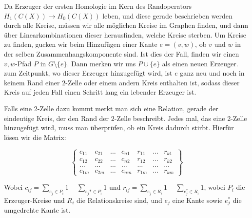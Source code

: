 \documentclass[11pt, a4paper,draft]{report}
\begin{document}
 	Da Erzeuger der ersten Homologie im Kern des Randoperators $H_1(C(X))\rightarrow H_0(C(X))$ leben, und diese gerade beschrieben werden durch alle Kreise, müssen wir alle möglichen Kreise im Graphen finden, und dann über Linearkombinationen dieser herausfinden, welche Kreise sterben.
 	Um Kreise zu finden, gucken wir beim Hinzufügen einer Kante $e=(v,w)$, ob $v$ und $w$ in der selben Zusammenhangskomponente sind. Ist dies der Fall, finden wir einen $v,w$-Pfad $P$ in $G\setminus \{e\}$. Dann merken wir uns $P\cup \{e\}$ als einen neuen Erzeuger. zum Zeitpunkt, wo dieser Erzeuger hinzugefügt wird, ist $e$ ganz neu und noch in keinem Rand einer $2$-Zelle oder einem andern Kreis enthalten ist, sodass dieser Kreis auf jeden Fall einen Schritt lang ein lebender Erzeuger ist. 
 	
 	Falls eine $2$-Zelle dazu kommt merkt man sich eine Relation, gerade der eindeutige Kreis, der den Rand der $2$-Zelle beschreibt. Jedes mal, das eine $2$-Zelle hinzugefügt wird, muss man überprüfen, ob ein Kreis dadurch stirbt. Hierfür lösen wir die Matrix:
 	
 	
 	$$\begin{Bmatrix}
 	c_{11} & c_{21} & \ldots &c_{n1} & r_{11} & \ldots  & r_{k1}\\
 	c_{12} & c_{22} & \ldots &c_{n2} & r_{12} & \ldots  & r_{k2}\\
 	\ldots & \ldots & \ldots & \ldots & \ldots & \ldots & \ldots \\
 	c_{1m} & c_{2m} & \ldots &c_{nm} & r_{1m} & \ldots  & r_{km}
 	\end{Bmatrix}$$
 	
 	Wobei $c_{ij} = \sum_{e_j\in P_i} 1 - \sum_{e_j*\in P_i}1$ und $r_{ij} = \sum_{e_j\in R_i} 1 - \sum_{e_j^*\in R_i}1$, wobei $P_i$ die Erzeuger-Kreise und $R_i$ die Relationskreise sind, und $e_j$ eine Kante sowie $e_j^*$ die umgedrehte Kante ist.
 	
\end{document}
